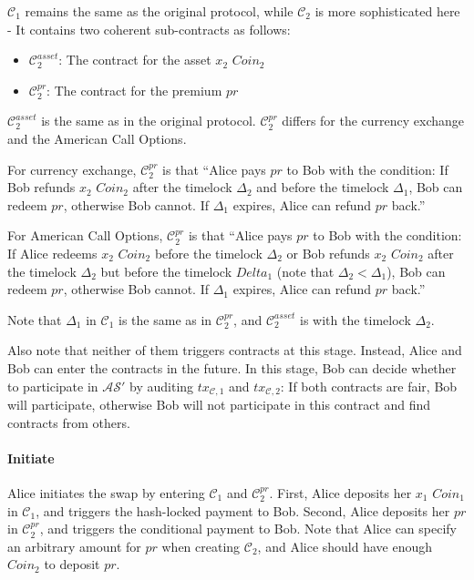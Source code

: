 $\mathcal{C}_1$ remains the same as the original protocol, while $\mathcal{C}_2$ is more sophisticated here - It contains two coherent sub-contracts as follows:

\begin{itemize}
    \item $\mathcal{C}^{asset}_2$: The contract for the asset $x_2$ $Coin_2$
    \item $\mathcal{C}^{pr}_2$: The contract for the premium $pr$
\end{itemize}

$\mathcal{C}^{asset}_2$ is the same as in the original protocol.
$\mathcal{C}^{pr}_2$ differs for the currency exchange and the American Call Options.

For currency exchange, $\mathcal{C}^{pr}_2$ is that
``Alice pays $pr$ to Bob with the condition: If Bob refunds $x_2$ $Coin_2$ after the timelock $\Delta_2$ and before the timelock $\Delta_1$, Bob can redeem $pr$, otherwise Bob cannot.
If $\Delta_1$ expires, Alice can refund $pr$ back.''

For American Call Options, $\mathcal{C}^{pr}_2$ is that
``Alice pays $pr$ to Bob with the condition: If Alice redeems $x_2$ $Coin_2$ before the timelock $\Delta_2$ or Bob refunds $x_2$ $Coin_2$ after the timelock $\Delta_2$ but before the timelock $Delta_1$ (note that $\Delta_2 < \Delta_1$), Bob can redeem $pr$, otherwise Bob cannot.
If $\Delta_1$ expires, Alice can refund $pr$ back.''


Note that $\Delta_1$ in $\mathcal{C}_1$ is the same as in $\mathcal{C}^{pr}_2$, and $\mathcal{C}^{asset}_2$ is with the timelock $\Delta_2$.

Also note that neither of them triggers contracts at this stage.
Instead, Alice and Bob can enter the contracts in the future.
In this stage, Bob can decide whether to participate in $\mathcal{AS}'$ by auditing $tx_{\mathcal{C}, 1}$ and $tx_{\mathcal{C}, 2}$: If both contracts are fair, Bob will participate, otherwise Bob will not participate in this contract and find contracts from others.

\paragraph{Initiate}
Alice initiates the swap by entering $\mathcal{C}_1$ and $\mathcal{C}^{pr}_2$.
First, Alice deposits her $x_1$ $Coin_1$ in $\mathcal{C}_1$, and triggers the hash-locked payment to Bob.
Second, Alice deposits her $pr$ in $\mathcal{C}^{pr}_2$, and triggers the conditional payment to Bob.
Note that Alice can specify an arbitrary amount for $pr$ when creating $\mathcal{C}_2$, and Alice should have enough $Coin_2$ to deposit $pr$.

